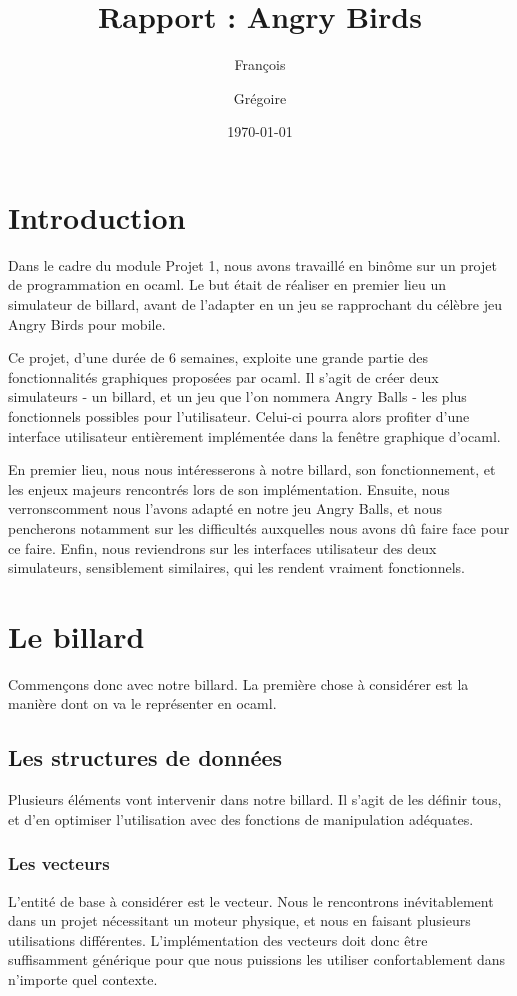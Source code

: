 \documentclass[a4paper,11pt]{article}
\title{Rapport : Angry Birds}
\author{François \sc{Pirot} \and Grégoire \sc{Beaudoire}}
\date{\today}
\begin{document}
\maketitle

\tableofcontents

\section*{Introduction}

Dans le cadre du module Projet 1, nous avons travaillé en binôme sur 
un projet de programmation en ocaml. Le but était de réaliser en premier
lieu un simulateur de billard, avant de l'adapter en un jeu se rapprochant
du célèbre jeu Angry Birds pour mobile.

Ce projet, d'une durée de 6 semaines, exploite une grande partie des fonctionnalités
graphiques proposées par ocaml. Il s'agit de créer deux simulateurs - un billard,
et un jeu que l'on nommera Angry Balls - les plus fonctionnels possibles pour
l'utilisateur. Celui-ci pourra alors profiter d'une interface utilisateur entièrement
implémentée dans la fenêtre graphique d'ocaml.

En premier lieu, nous nous intéresserons à notre billard, son fonctionnement, 
et les enjeux majeurs rencontrés lors de son implémentation. 
Ensuite, nous verronscomment nous l'avons adapté en notre jeu Angry Balls, et nous 
pencherons notamment sur les difficultés auxquelles nous avons dû faire face pour ce faire.
Enfin, nous reviendrons sur les interfaces utilisateur des deux simulateurs, sensiblement
similaires, qui les rendent vraiment fonctionnels.

\section {Le billard}
Commençons donc avec notre billard. La première chose à considérer est la manière dont on
va le représenter en ocaml.

\subsection{Les structures de données}
Plusieurs éléments vont intervenir dans notre billard. Il s'agit de les définir tous, et d'en
optimiser l'utilisation avec des fonctions de manipulation adéquates.

\subsubsection{Les vecteurs}
L'entité de base à considérer est le vecteur. Nous le rencontrons inévitablement dans
un projet nécessitant un moteur physique, et nous en faisant plusieurs utilisations différentes.
L'implémentation des vecteurs doit donc être suffisamment générique pour que nous puissions
les utiliser confortablement dans n'importe quel contexte. 
\end{document}

